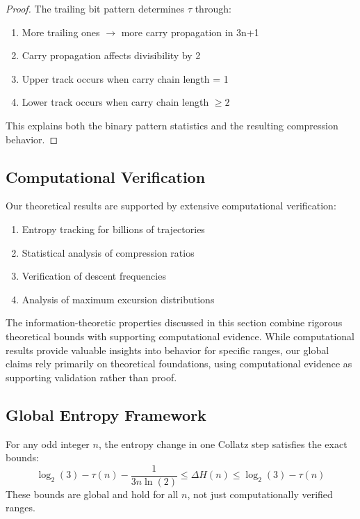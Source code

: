 \begin{proof}
The trailing bit pattern determines $\tau$ through:
\begin{enumerate}
\item More trailing ones $\rightarrow$ more carry propagation in 3n+1
\item Carry propagation affects divisibility by 2
\item Upper track occurs when carry chain length = 1
\item Lower track occurs when carry chain length $\geq 2$
\end{enumerate}
This explains both the binary pattern statistics and the resulting compression behavior.
\end{proof}

\subsection{Computational Verification}

Our theoretical results are supported by extensive computational verification:
\begin{enumerate}
\item Entropy tracking for billions of trajectories
\item Statistical analysis of compression ratios
\item Verification of descent frequencies
\item Analysis of maximum excursion distributions
\end{enumerate}

\begin{remark}
The information-theoretic properties discussed in this section combine rigorous theoretical bounds with supporting computational evidence. While computational results provide valuable insights into behavior for specific ranges, our global claims rely primarily on theoretical foundations, using computational evidence as supporting validation rather than proof.
\end{remark}

\subsection{Global Entropy Framework}

\begin{theorem}
For any odd integer $n$, the entropy change in one Collatz step satisfies the exact bounds:
\[
\log_2(3) - \tau(n) - \frac{1}{3n\ln(2)} \leq \Delta H(n) \leq \log_2(3) - \tau(n)
\]
These bounds are global and hold for all $n$, not just computationally verified ranges.
\end{theorem}

